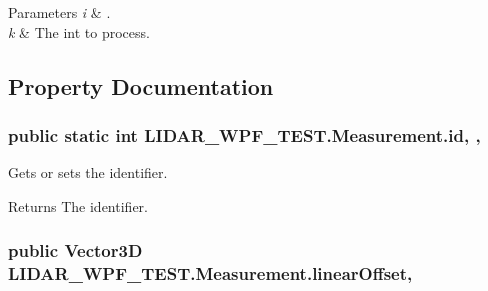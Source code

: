 \begin{DoxyParams}{Parameters}
{\em i} & . \\
\hline
{\em k} & The int to process. \\
\hline
\end{DoxyParams}


\subsection{Property Documentation}
\hypertarget{class_l_i_d_a_r___w_p_f___t_e_s_t_1_1_measurement_acef1860574df9ec13ba38c5b530fd2b3}{}
\subsubsection[{id}]{\setlength{\rightskip}{0pt plus 5cm}public static int L\+I\+D\+A\+R\+\_\+\+W\+P\+F\+\_\+\+T\+E\+S\+T.\+Measurement.\+id\hspace{0.3cm}{\ttfamily [static]}, {\ttfamily [get]}, {\ttfamily [set]}}\label{class_l_i_d_a_r___w_p_f___t_e_s_t_1_1_measurement_acef1860574df9ec13ba38c5b530fd2b3}


Gets or sets the identifier. 

\begin{DoxyReturn}{Returns}
The identifier. 
\end{DoxyReturn}
\hypertarget{class_l_i_d_a_r___w_p_f___t_e_s_t_1_1_measurement_a9a2cf4d11bf826c96533fcaae3bcc4a4}{}
\subsubsection[{linear\+Offset}]{\setlength{\rightskip}{0pt plus 5cm}public Vector3\+D L\+I\+D\+A\+R\+\_\+\+W\+P\+F\+\_\+\+T\+E\+S\+T.\+Measurement.\+linear\+Offset\hspace{0.3cm}{\ttfamily [get]}, {\ttfamily [set]}}\label{class_l_i_d_a_r___w_p_f___t_e_s_t_1_1_measurement_a9a2cf4d11bf826c96533fcaae3bcc4a4}


